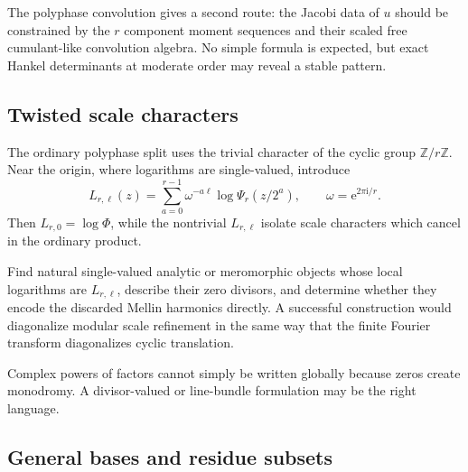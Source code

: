 \documentclass[11pt,oneside]{article}
\theoremstyle{definition}
\newcommand{\e}{\mathrm e}
\newcommand{\ii}{\mathrm i}
\newcommand{\Z}{\mathbb Z}
\begin{document}
The polyphase convolution gives a second route: the Jacobi data of $u$ should
be constrained by the $r$ component moment sequences and their scaled free
cumulant-like convolution algebra.  No simple formula is expected, but exact
Hankel determinants at moderate order may reveal a stable pattern.

\subsection{Twisted scale characters}

The ordinary polyphase split uses the trivial character of the cyclic group
$\Z/r\Z$.  Near the origin, where logarithms are single-valued, introduce
\begin{equation}
 L_{r,\ell}(z)=\sum_{a=0}^{r-1}\omega^{-a\ell}
 \log\Psi_r(z/2^a),
 \qquad \omega=\e^{2\pi\ii/r}.                            \label{p2:eq:twisted-scale-log}
\end{equation}
Then $L_{r,0}=\log\Phi$, while the nontrivial $L_{r,\ell}$ isolate scale
characters which cancel in the ordinary product.

\begin{problem}
Find natural single-valued analytic or meromorphic objects whose local
logarithms are $L_{r,\ell}$, describe their zero divisors, and determine whether
they encode the discarded Mellin harmonics directly.  A successful construction
would diagonalize modular scale refinement in the same way that the finite
Fourier transform diagonalizes cyclic translation.
\end{problem}

Complex powers of factors cannot simply be written globally because zeros
create monodromy.  A divisor-valued or line-bundle formulation may be the right
language.

\subsection{General bases and residue subsets}
\end{document}
